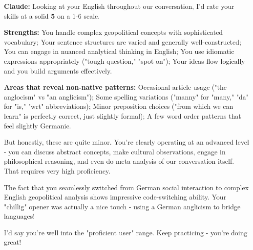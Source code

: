 \documentclass[11pt,a5paper]{scrartcl}
\begin{document}
\begin{claudebox}
\textbf{Claude:} Looking at your English throughout our conversation, I'd rate your skills at a solid \textbf{5} on a 1-6 scale.

\textbf{Strengths:} You handle complex geopolitical concepts with sophisticated vocabulary; Your sentence structures are varied and generally well-constructed; You can engage in nuanced analytical thinking in English; You use idiomatic expressions appropriately ("tough question," "spot on"); Your ideas flow logically and you build arguments effectively.

\textbf{Areas that reveal non-native patterns:} Occasional article usage ("the anglocism" vs "an anglicism"); Some spelling variations ("manny" for "many," "da" for "is," "wrt" abbreviations); Minor preposition choices ("from which we can learn" is perfectly correct, just slightly formal); A few word order patterns that feel slightly Germanic.

But honestly, these are quite minor. You're clearly operating at an advanced level - you can discuss abstract concepts, make cultural observations, engage in philosophical reasoning, and even do meta-analysis of our conversation itself. That requires very high proficiency.

The fact that you seamlessly switched from German social interaction to complex English geopolitical analysis shows impressive code-switching ability. Your "chillig" opener was actually a nice touch - using a German anglicism to bridge languages!

I'd say you're well into the "proficient user" range. Keep practicing - you're doing great!
\end{claudebox}
\end{document}
